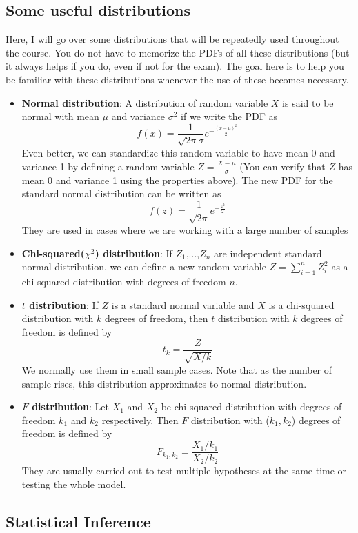 \documentclass[12pt]{article}
\theoremstyle{definition}
\theoremstyle{property}
\theoremstyle{assumption}
\theoremstyle{example}
\theoremstyle{comment}
\begin{document}
\subsection{Some useful distributions}
Here, I will go over some distributions that will be repeatedly used throughout the course. You do not have to memorize the PDFs of all these distributions (but it always helps if you do, even if not for the exam). The goal here is to help you be familiar with these distributions whenever the use of these becomes necessary.
\begin{itemize}
\item \textbf{Normal distribution}: A distribution of random variable $X$ is said to be normal with mean $\mu$ and variance $\sigma^2$ if we write the PDF as
\[
f(x) = \frac{1}{\sqrt{2\pi}\sigma}e^{-\frac{(x-\mu)^2}{2}}
\]
Even better, we can standardize this random variable to have mean 0 and variance 1 by defining a random variable $Z=\frac{X-\mu}{\sigma}$ (You can verify that $Z$ has mean 0 and variance 1 using the properties above).  The new PDF for the standard normal distribution can be written as 
\[
f(z) = \frac{1}{\sqrt{2\pi}}e^{-\frac{z^2}{2}}
\]
They are used in cases where we are working with a large number of samples
\item \textbf{Chi-squared($\chi^2$) distribution}: If $Z_1$,...,$Z_n$ are independent standard normal distribution, we can define a new random variable $Z=\sum_{i=1}^n Z_i^2$ as a chi-squared distribution with degrees of freedom $n$.  
\item \textbf{$t$ distribution}: If $Z$ is a standard normal variable and $X$ is a chi-squared distribution with $k$ degrees of freedom, then $t$ distribution with $k$ degrees of freedom is defined by
\[
t_k=\frac{Z}{\sqrt{X/k}}
\]
We normally use them in small sample cases. Note that as the number of sample rises, this distribution approximates to normal distribution. 
\item \textbf{$F$ distribution}: Let $X_1$ and $X_2$ be chi-squared distribution with degrees of freedom $k_1$ and $k_2$ respectively. Then $F$ distribution with ($k_1,k_2$) degrees of freedom is defined by
\[
F_{k_1,k_2}=\frac{X_1/k_1}{X_2/k_2}
\]
They are usually carried out to test multiple hypotheses at the same time or testing the whole model. 
\end{itemize}
\subsection{Statistical Inference}
\end{document}
